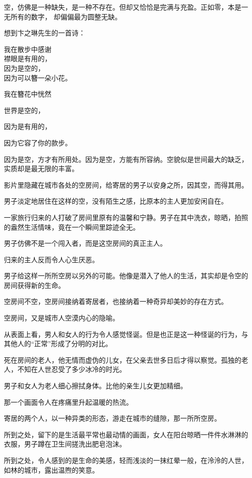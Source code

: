 \documentclass[12pt,a4paper]{article}
\begin{document}
		空，仿佛是一种缺失，是一种不存在。但却又恰恰是完满与充盈。正如零，本是一无所有的数字，
	却偏偏最为圆整无缺。

		想到卞之琳先生的一首诗：

		\longpoem{}{}{}
		我在散步中感谢 \\
		襟眼是有用的，\\
		因为是空的，\\
		因为可以簪一朵小花。
		\endlongpoem

		我在簪花中恍然\par
		世界是空的，\par
		因为是有用的，\par
		因为它容了你的款步。\par
		因为是空，方才有所用处。因为是空，方能有所容纳。空貌似是世间最大的缺乏，实质却是最无限的丰富。\par
		影片里隐藏在城市各处的空房间，给寄居的男子以安身之所，因其空，而得其用。\par
		男子淡定地居住在这样的空，没有陌生之感，比原本的主人更加安闲自在。\par
		一家旅行归来的人打破了房间里原有的温馨和宁静。男子在其中洗衣，晾晒，拍照的盎然生活情味，竟在一个瞬间里踪迹全无。\par
		男子仿佛不是一个闯入者，而是这空房间的真正主人。\par
		归来的主人反而令人心生厌恶。\par
		男子给这样一所所空房以另外的可能。他像是潜入了他人的生活，其实却是令空的房间获得新的生命。\par
		空房间不空，空房间接纳着寄居者，也接纳着一种奇异却美妙的存在方式。\par
		空房间，又是城市人空漠内心的隐喻。\par
		从表面上看，男人和女人的行为令人感觉怪诞。但是也正是这一种怪诞的行为，与其他人的“正常”形成了分明的对比。\par
		死在房间的老人，他无情而虚伪的儿女，在父亲去世多日后才得以察觉。孤独的老人，不知在人世忍受了多少冰冷的时光。\par
		男子和女人为老人细心擦拭身体。比他的亲生儿女更加精细。\par
		那一个画面令人在疼痛里升起温暖的热流。\par
		寄居的两个人，以一种异类的形态，游走在城市的缝隙，那一所所空房。\par
		所到之处，留下的是生活最平常也最动情的画面，女人在阳台晾晒一件件水淋淋的衣服，男子蹲在卫生间搓洗出肥皂泡沫。\par
		所到之处，令人感到的是生命的美感，轻而浅淡的一抹红晕一般，在泠泠的人世，如林的城市，露出温煦的笑意。\par
\end{document}
